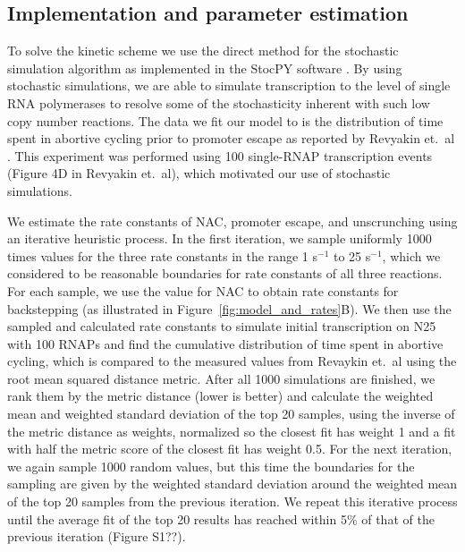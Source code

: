 \subsection{Implementation and parameter estimation}
To solve the kinetic scheme we use the direct method for the stochastic
simulation algorithm \cite{gillespie_exact_1977} as implemented in the StocPY
software \cite{maarleveld_stochpy:_2013}. By using stochastic simulations, we
are able to simulate transcription to the level of single RNA polymerases to
resolve some of the stochasticity inherent with such low copy number
reactions. The data we fit our model to is the distribution of time spent in
abortive cycling prior to promoter escape as reported by Revyakin et.\ al
\cite{revyakin_abortive_2006}. This experiment was performed using 100
single-RNAP transcription events (Figure 4D in Revyakin et.\ al), which
motivated our use of stochastic simulations.

We estimate the rate constants of NAC, promoter escape, and unscrunching using an
iterative heuristic process. In the first iteration, we sample uniformly 1000
times values for the three rate constants in the range 1 s$^{-1}$ to 25
s$^{-1}$, which we considered to be reasonable boundaries for rate constants
of all three reactions. For each sample, we use the value for NAC to obtain
rate constants for backstepping (as illustrated in
Figure~\ref{fig:model_and_rates}B). We then use the sampled and calculated
rate constants to simulate initial transcription on N25 with 100 RNAPs and
find the cumulative distribution of time spent in abortive cycling, which is
compared to the measured values from Revaykin et.\ al
\cite{revyakin_abortive_2006} using the root mean squared distance metric.
After all 1000 simulations are finished, we rank them by the metric distance (lower is
better) and calculate the weighted mean and weighted standard deviation of the
top 20 samples, using the inverse of the metric distance as weights, normalized
so the closest fit has weight 1 and a fit with half the metric score of the
closest fit has weight 0.5. For the next iteration, we again sample 1000
random values, but this time the boundaries for the sampling are
given by the weighted standard deviation around the weighted mean of the top
20 samples from the previous iteration. We repeat this iterative process
until the average fit of the top 20 results has reached within 5\% of that of
the previous iteration (Figure S1??).

